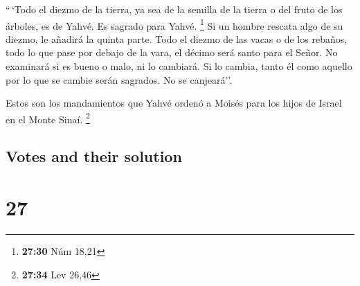 \begin{paracol}{2}
 ``\,`Todo el diezmo de la tierra, ya sea de la semilla
de la tierra o del fruto de los árboles, es de Yahvé. Es sagrado para
Yahvé. \footnote{\textbf{27:30} Núm 18,21}  Si un hombre
rescata algo de su diezmo, le añadirá la quinta parte. 
Todo el diezmo de las vacas o de los rebaños, todo lo que pase por
debajo de la vara, el décimo será santo para el Señor. 
No examinará si es bueno o malo, ni lo cambiará. Si lo cambia, tanto él
como aquello por lo que se cambie serán sagrados. No se canjeará''.

 Estos son los mandamientos que Yahvé ordenó a Moisés
para los hijos de Israel en el Monte Sinaí. \footnote{\textbf{27:34} Lev
  26,46} \switchcolumn \begin{otherlanguage}{english}

\hypertarget{votes-and-their-solution}{%
\subsection{Votes and their solution}\label{votes-and-their-solution}}

\hypertarget{section-53}{%
\section{27}\label{section-53}}


\end{otherlanguage}
\end{paracol}
